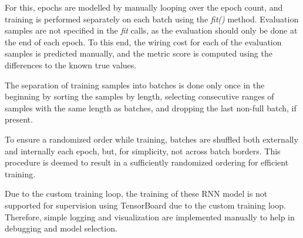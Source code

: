 For this, epochs are modelled by manually looping over the epoch count, and training is performed separately on each batch using the \textit{fit()} method. Evaluation samples are not specified in the \textit{fit} calls, as the evaluation should only be done at the end of each epoch. To this end, the wiring cost for each of the evaluation samples is predicted manually, and the metric score is computed using the differences to the known true values.

The separation of training samples into batches is done only once in the beginning by sorting the samples by length, selecting consecutive ranges of samples with the same length as batches, and dropping the last non-full batch, if present.

To ensure a randomized order while training, batches are shuffled both externally and internally each epoch, but, for simplicity, not across batch borders. This procedure is deemed to result in a sufficiently randomized ordering for efficient training.

Due to the custom training loop, the training of these \gls{RNN} model is not supported for supervision using TensorBoard due to the custom training loop. Therefore, simple logging and visualization are implemented manually to help in debugging and model selection.

\pagebreak

